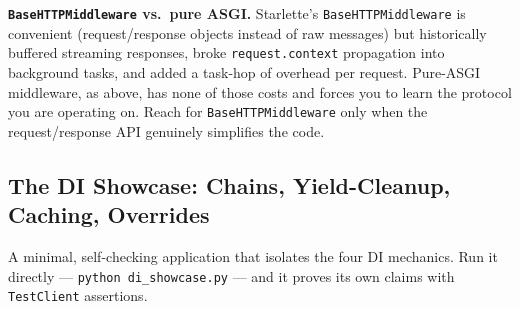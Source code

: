 \begin{warningbox}
\textbf{\texttt{BaseHTTPMiddleware} vs.\ pure ASGI.} Starlette's
\texttt{BaseHTTPMiddleware} is convenient (request/response objects instead
of raw messages) but historically buffered streaming responses, broke
\texttt{request.context} propagation into background tasks, and added a
task-hop of overhead per request. Pure-ASGI middleware, as above, has none
of those costs and forces you to learn the protocol you are operating on.
Reach for \texttt{BaseHTTPMiddleware} only when the request/response API
genuinely simplifies the code.
\end{warningbox}

\subsection{The DI Showcase: Chains, Yield-Cleanup, Caching, Overrides}
\label{sec:ch6-code-di}

A minimal, self-checking application that isolates the four DI mechanics.
Run it directly --- \texttt{python di\_showcase.py} --- and it proves its own
claims with \texttt{TestClient} assertions.

